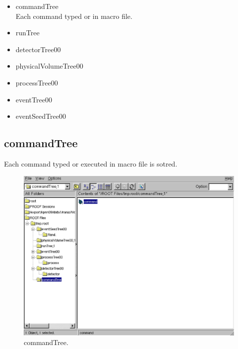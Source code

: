 \documentclass[a4paper,12pt]{article}
\begin{document}
 \begin{itemize}
  \item commandTree\\
	Each command typed or in macro file.
  \item runTree
  \item detectorTree00
  \item physicalVolumeTree00
  \item processTree00
  \item eventTree00
  \item eventSeedTree00
 \end{itemize}

 \subsection{commandTree}
 Each command typed or executed in macro file is sotred.
 \begin{figure}[H]
  \begin{center}
   \includegraphics[scale=0.5]{xwd/cm.eps}
  \end{center}
  \caption{commandTree.}
 \end{figure}
\end{document}
